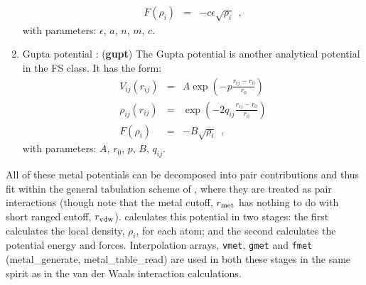\begin{enumerate}
\begin{eqnarray}
F(\rho_{i}) &=& -c \epsilon \sqrt{\rho_{i}}~~, \nonumber
\end{eqnarray}
with parameters: $\epsilon$, $a$, $n$, $m$, $c$.
\item Gupta potential \cite{cleri-93a}:  ({\bf gupt})
The Gupta potential is another analytical potential in the FS
class.  It has the form:
\begin{eqnarray}
V_{ij}(r_{ij}) &=& A \exp \left(-p \frac{r_{ij}-r_{0}}{r_{0}}\right) \nonumber \\
\rho_{ij}(r_{ij}) &=& \exp \left(-2 q_{ij} \frac{r_{ij}-r_{0}}{r_{0}}\right) \\
F(\rho_{i}) &=& -B \sqrt{\rho_{i}}~~, \nonumber
\end{eqnarray}
with parameters: $A$, $r_{0}$, $p$, $B$, $q_{ij}$.
\end{enumerate}

All of these metal potentials can be decomposed into pair
contributions and thus fit within the general tabulation scheme of \D,
where they are treated as pair interactions (though note that the
metal cutoff, $r_{\rm met}$ has nothing to do with short ranged cutoff,
$r_{\rm vdw}$).  \D calculates this potential in two stages: the first
calculates the local density, $\rho_{i}$, for each atom; and the
second calculates the potential energy and forces.  Interpolation
arrays, {\tt vmet}, {\tt gmet} and {\tt fmet} ({\sc metal\_generate},
{\sc metal\_table\_read}) are used in both these stages in the same
spirit as in the van der Waals interaction calculations.

